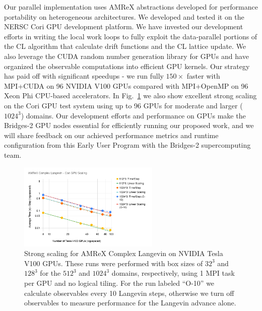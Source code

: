 \documentclass[onecolumn, 12pt]{article}
\begin{document}
Our parallel implementation uses AMReX abstractions developed for performance portability on heterogeneous architectures. We developed and tested it on the NERSC Cori GPU development platform. We have invested our development efforts in writing the local work loops to fully exploit the data-parallel portions of the CL algorithm that calculate drift functions and the CL lattice update. We also leverage the CUDA random number generation library for GPUs and have organized the observable computations into efficient GPU kernels. Our strategy has paid off with significant speedups - we run fully $150\times$ faster with MPI+CUDA on 96 NVIDIA V100 GPUs compared with MPI+OpenMP on 96 Xeon Phi CPU-based accelerators.
In Fig.~\ref{Fig:GPUScaling} we also show excellent strong scaling on the Cori GPU test system using up to 96 GPUs for moderate and larger ($1024^3$) domains. Our development efforts and performance on GPUs make the Bridges-2 GPU nodes essential for efficiently running our proposed work, and we will share feedback on our achieved performance metrics and runtime configuration from this Early User Program with the Bridges-2 supercomputing team.

%
%

%
\begin{figure}[h]
\centering
\includegraphics[width=0.6\textwidth]{./AMReX_Complex_Langevin_Cori_GPU_Scaling.png}
	\caption{\label{Fig:GPUScaling} Strong scaling for AMReX Complex Langevin on NVIDIA Tesla V100 GPUs. These runs were performed with box sizes of $32^3$ and $128^3$ for the $512^3$ and $1024^3$ domains, respectively, using 1 MPI task per GPU and no logical tiling. For the run labeled ``O-10'' we calculate observables every 10 Langevin steps, otherwise we turn off observables to measure performance for the Langevin advance alone.\vspace{-3mm}}
\end{figure}
%
\end{document}
